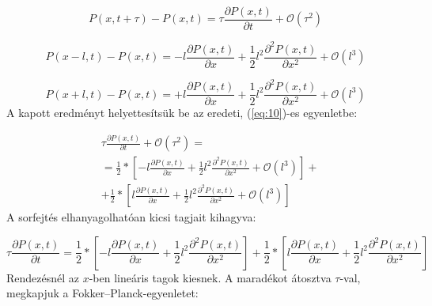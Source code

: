 \begin{equation} \label{eq:11}
    P \left( x, t + \tau \right) - P \left( x, t \right)
    =
    \tau \frac{\partial P \left( x, t \right)}{\partial t} + \mathcal{O} \left( \tau^{2} \right)
\end{equation}

\begin{equation} \label{eq:12}
    P \left( x - l, t \right) - P \left( x, t \right)
    =
    -l \frac{\partial P \left( x, t \right)}{\partial x} + \frac{1}{2} l^{2} \frac{\partial^{2} P \left( x, t \right)}{\partial x^{2}} + \mathcal{O} \left( l^{3} \right)
\end{equation}

\begin{equation} \label{eq:13}
    P \left( x + l, t \right) - P \left( x, t \right)
    =
    +l \frac{\partial P \left( x, t \right)}{\partial x} + \frac{1}{2} l^{2} \frac{\partial^{2} P \left( x, t \right)}{\partial x^{2}} + \mathcal{O} \left( l^{3} \right)
\end{equation}
A kapott eredményt helyettesítsük be az eredeti, (\ref{eq:10})-es egyenletbe:

\begin{align} \label{eq:14}
    &\tau \frac{\partial P \left( x, t \right)}{\partial t} + \mathcal{O} \left( \tau^{2} \right) = \nonumber \\
    &=
    \frac{1}{2} * \left[ -l \frac{\partial P \left( x, t \right)}{\partial x} + \frac{1}{2} l^{2} \frac{\partial^{2} P \left( x, t \right)}{\partial x^{2}} + \mathcal{O} \left( l^{3} \right) \right] + \nonumber \\
    &+
    \frac{1}{2} * \left[ l \frac{\partial P \left( x, t \right)}{\partial x} + \frac{1}{2} l^{2} \frac{\partial^{2} P \left( x, t \right)}{\partial x^{2}} + \mathcal{O} \left( l^{3} \right) \right]
\end{align}
A sorfejtés elhanyagolhatóan kicsi tagjait kihagyva:

\begin{equation} \label{eq:15}
    \tau \frac{\partial P \left( x, t \right)}{\partial t}
    =
    \frac{1}{2} * \left[ -l \frac{\partial P \left( x, t \right)}{\partial x} + \frac{1}{2} l^{2} \frac{\partial^{2} P \left( x, t \right)}{\partial x^{2}} \right] + \frac{1}{2} * \left[ l \frac{\partial P \left( x, t \right)}{\partial x} + \frac{1}{2} l^{2} \frac{\partial^{2} P \left( x, t \right)}{\partial x^{2}} \right]
\end{equation}
Rendezésnél az $x$-ben lineáris tagok kiesnek. A maradékot átosztva $\tau$-val, megkapjuk a Fokker--Planck-egyenletet:

